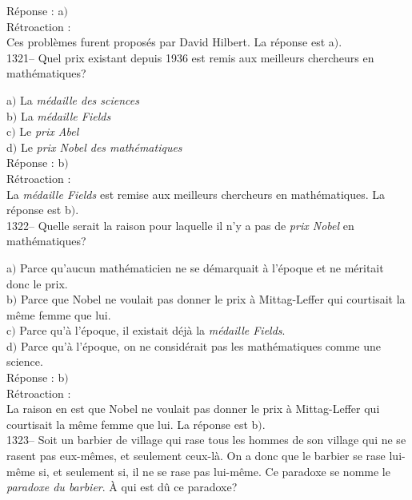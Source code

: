 ﻿\documentclass[letterpaper, 12pt]{article}
\begin{document}
R\'eponse : a$)$\\

R\'etroaction : \\
Ces probl\`emes furent propos\'es par David Hilbert.
La r\'eponse est  a$)$.\\

1321-- Quel prix existant depuis 1936 est remis aux meilleurs
chercheurs en math\'ematiques?

a$)$ La {\sl m\'edaille des sciences} \\
b$)$ La {\sl m\'edaille Fields} \\
c$)$ Le {\sl prix Abel} \\
d$)$ Le {\sl prix Nobel des math\'ematiques}\\

R\'eponse : b$)$\\

R\'etroaction : \\
La {\sl m\'edaille Fields} est remise aux meilleurs chercheurs en
math\'ematiques.
La r\'eponse est  b$)$.\\

1322-- Quelle serait la raison pour laquelle il n'y a pas de {\sl
prix Nobel} en math\'ematiques?

a$)$ Parce qu'aucun math\'ematicien ne se d\'emarquait \`a l'\'epoque et ne
m\'eritait donc le prix. \\
b$)$ Parce que Nobel ne voulait pas donner le prix \`a Mittag-Leffer qui
courtisait la m\^eme femme que lui. \\
c$)$ Parce qu'\`a l'\'epoque, il existait d\'ej\`a la {\sl m\'edaille
Fields}. \\
d$)$ Parce qu'\`a l'\'epoque, on ne consid\'erait pas les math\'ematiques
comme une science. \\

R\'eponse : b$)$\\

R\'etroaction : \\
La raison en est que Nobel ne voulait pas donner le prix \`a
Mittag-Leffer qui courtisait la m\^eme femme que lui.
La r\'eponse est  b$)$.\\

1323-- Soit un barbier de village qui rase tous les hommes de son
village qui ne se rasent pas eux-m\^emes, et seulement ceux-l\`a. On
a donc que le barbier se rase lui-m\^eme si, et seulement si, il ne
se rase pas lui-m\^eme. Ce paradoxe se nomme le {\sl paradoxe du
barbier}. \`A qui est d\^u ce paradoxe?
\end{document}
